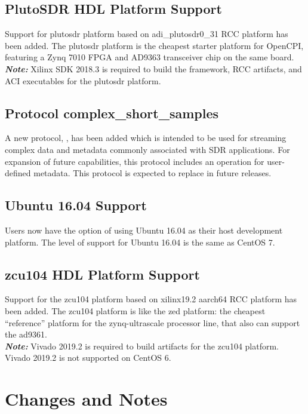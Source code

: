 \subsection{PlutoSDR HDL Platform Support}
\label{sec:17_plutosdr}
Support for plutosdr platform based on adi\_{}plutosdr0\_{}31 RCC platform has been added. The plutosdr platform is the cheapest starter platform for OpenCPI, featuring a Zynq 7010 FPGA and AD9363 transceiver chip on the same board.\\

\textit{\textbf{Note:}} Xilinx SDK 2018.3 is required to build the framework, RCC artifacts, and ACI executables for the plutosdr platform.

\subsection{Protocol complex\_{}short\_{}samples}
\label{sec:17_css}
A new protocol, , has been added which is intended to be used for streaming complex data and metadata commonly associated with SDR applications. For expansion of future capabilities, this protocol includes an operation for user-defined metadata. This protocol is expected to replace  in future releases.

\subsection{Ubuntu 16.04 Support}
\label{sec:17_ubuntu_16.04}
Users now have the option of using Ubuntu 16.04 as their host development platform. The level of support for Ubuntu 16.04 is the same as CentOS 7.

\subsection{zcu104 HDL Platform Support}
\label{sec:17_zcu104}
Support for the zcu104 platform based on xilinx19.2 aarch64 RCC platform has been added. The zcu104 platform is like the zed platform: the cheapest ``reference'' platform for the zynq-ultrascale processor line, that
also can support the ad9361.\\

\textit{\textbf{Note:}} Vivado 2019.2 is required to build artifacts for the zcu104 platform. Vivado 2019.2 is not supported on CentOS 6.


\section{Changes and Notes}
